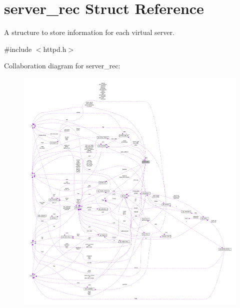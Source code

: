 \hypertarget{structserver__rec}{}\section{server\+\_\+rec Struct Reference}
\label{structserver__rec}


A structure to store information for each virtual server.  




{\ttfamily \#include $<$httpd.\+h$>$}



Collaboration diagram for server\+\_\+rec\+:
\nopagebreak
\begin{figure}[H]
\begin{center}
\leavevmode
\includegraphics[width=350pt]{structserver__rec__coll__graph}
\end{center}
\end{figure}
